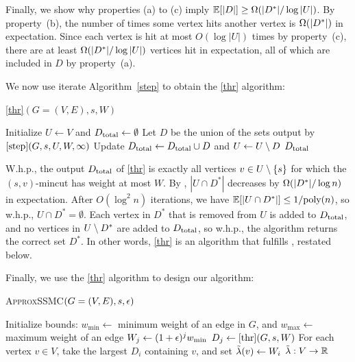 Finally, we show why properties (a) to (c) imply $\mathbb E[|D|] \ge \Omega(|D^*|/\log|U|)$. By property~(b), the number of times some vertex hits another vertex is $\Omega(|D^*|)$ in expectation. Since each vertex is hit at most $O(\log|U|)$ times by property~(c), there are at least $\Omega(|D^*|/\log|U|)$ vertices hit in expectation, all of which are included in $D$ by property~(a).
\EP


We now use iterate Algorithm~\ref{step} to obtain the \ref{thr} algorithm:

\begin{algorithm}
\caption{\ref{thr}$(G=(V,E),s, W)$}
\begin{algorithmic}[1]
\State Initialize $U\gets V$ and $D_{\textup{total}}\gets\emptyset$
 \State Let $D$ be the union of the sets output by $\ref{step}(G,s,U, W,\infty)$
 \State Update $D_{\textup{total}}\gets D_{\textup{total}}\cup D$ and $U\gets U\setminus D$
\EndFor
\State\Return $D_{\textup{total}}$
\end{algorithmic}
\end{algorithm}


\BC{}
W.h.p., the output $D_{\textup{total}}$ of \ref{thr} is exactly all vertices $v\in U\setminus \{s\}$ for which the $(s,v)$-mincut has weight at most $ W$. 
\EC
\BP
By , $|U\cap D^*|$ decreases by $\Omega(|D^*|/\log n)$ in expectation. After $O(\log^2n)$ iterations, we have $\mathbb E[|U\cap D^*|] \le 1/\textup{poly}(n)$, so w.h.p., $U\cap D^*=\emptyset$. Each vertex in $D^*$ that is removed from $U$ is added to $D_{\textup{total}}$, and no vertices in $U\setminus D^*$ are added to $D_{\textup{total}}$, so w.h.p., the algorithm returns the correct set $D^*$.
\EP
In other words, \ref{thr} is an algorithm that fulfills , restated below.
\Thr*

Finally, we use the \ref{thr} algorithm to design our \ssc algorithm:

\begin{algorithm}
\caption{\textsc{ApproxSSMC}$(G=(V,E),s,\epsilon)$}
\begin{algorithmic}[1]
 \State Initialize bounds: $ w_{\min} \gets$ minimum weight of an edge in $G$, and $ w_{\max}\gets$ maximum weight of an edge %
 \State $ W_j\gets (1+\epsilon)^j w_{\min}$
 \State $D_j\gets \ref{thr}(G,s, W)$
\EndFor
\State For each vertex $v\in V$, take the largest $D_i$ containing $v$, and set $\tilde{\lambda}(v)\gets  W_i$
\State\Return $\tilde{\lambda}:V\to \mathbb R$
\end{algorithmic}
\end{algorithm}

